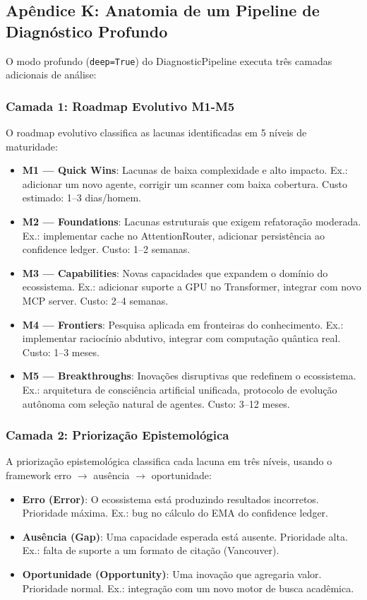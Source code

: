 \subsection{Apêndice K: Anatomia de um Pipeline de Diagnóstico Profundo}
\label{sec:apendice-deep-diagnose}

O modo profundo (\texttt{deep=True}) do DiagnosticPipeline executa três camadas adicionais de análise:

\subsubsection{Camada 1: Roadmap Evolutivo M1-M5}

O roadmap evolutivo classifica as lacunas identificadas em 5 níveis de maturidade:

\begin{itemize}
  \item \textbf{M1 — Quick Wins}: Lacunas de baixa complexidade e alto impacto. Ex.: adicionar um novo agente, corrigir um scanner com baixa cobertura. Custo estimado: 1--3 dias/homem.
  \item \textbf{M2 — Foundations}: Lacunas estruturais que exigem refatoração moderada. Ex.: implementar cache no AttentionRouter, adicionar persistência ao confidence ledger. Custo: 1--2 semanas.
  \item \textbf{M3 — Capabilities}: Novas capacidades que expandem o domínio do ecossistema. Ex.: adicionar suporte a GPU no Transformer, integrar com novo MCP server. Custo: 2--4 semanas.
  \item \textbf{M4 — Frontiers}: Pesquisa aplicada em fronteiras do conhecimento. Ex.: implementar raciocínio abdutivo, integrar com computação quântica real. Custo: 1--3 meses.
  \item \textbf{M5 — Breakthroughs}: Inovações disruptivas que redefinem o ecossistema. Ex.: arquitetura de consciência artificial unificada, protocolo de evolução autônoma com seleção natural de agentes. Custo: 3--12 meses.
\end{itemize}

\subsubsection{Camada 2: Priorização Epistemológica}

A priorização epistemológica classifica cada lacuna em três níveis, usando o framework erro $\to$ ausência $\to$ oportunidade:

\begin{itemize}
  \item \textbf{Erro (Error)}: O ecossistema está produzindo resultados incorretos. Prioridade máxima. Ex.: bug no cálculo do EMA do confidence ledger.
  \item \textbf{Ausência (Gap)}: Uma capacidade esperada está ausente. Prioridade alta. Ex.: falta de suporte a um formato de citação (Vancouver).
  \item \textbf{Oportunidade (Opportunity)}: Uma inovação que agregaria valor. Prioridade normal. Ex.: integração com um novo motor de busca acadêmica.
\end{itemize}

